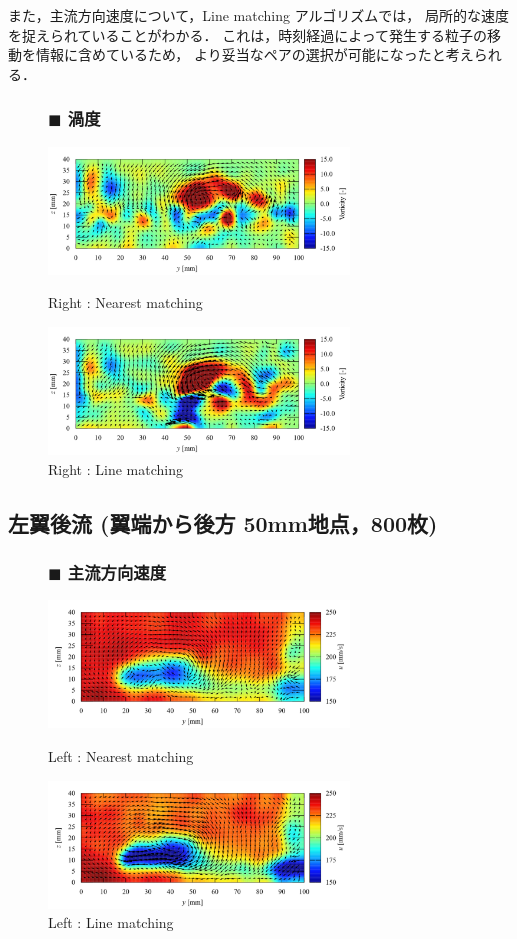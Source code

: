 \documentclass[twocolumn,a4j]{jsarticle}
\begin{document}
\newpage
また，主流方向速度について，Line matching アルゴリズムでは，
局所的な速度を捉えられていることがわかる．
これは，時刻経過によって発生する粒子の移動を情報に含めているため，
より妥当なペアの選択が可能になったと考えられる．

\begin{figure}[htbp]
  \subsubsection*{$\blacksquare$ 渦度}
  \centering
  \includegraphics[keepaspectratio, width=80mm]{../images/vor_n_R.png}
  \caption{Right : Nearest matching}
  \includegraphics[keepaspectratio, width=80mm]{../images/vor_l_R.png}
  \caption{Right : Line matching}
\end{figure}

\subsection{左翼後流 (翼端から後方 50mm地点，800枚)}
\begin{figure}[htbp]
  \subsubsection*{$\blacksquare$ 主流方向速度}
  \centering
  \includegraphics[keepaspectratio, width=80mm]{../images/vel_n_L.png}
  \caption{Left : Nearest matching}
  \includegraphics[keepaspectratio, width=80mm]{../images/vel_l_L.png}
  \caption{Left : Line matching}
\end{figure}
\end{document}
